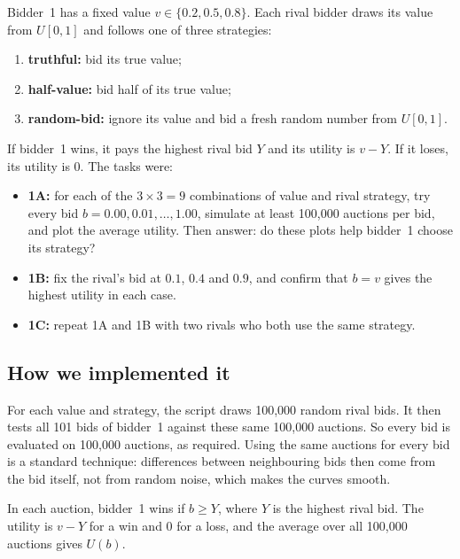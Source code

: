 \documentclass[11pt,a4paper]{article}
\begin{document}
Bidder~1 has a fixed value $v\in\{0.2, 0.5, 0.8\}$. Each rival bidder draws its value from $U[0,1]$ and follows one of three strategies:
\begin{enumerate}
  \item[(a)] \textbf{truthful:} bid its true value;
  \item[(b)] \textbf{half-value:} bid half of its true value;
  \item[(c)] \textbf{random-bid:} ignore its value and bid a fresh random number from $U[0,1]$.
\end{enumerate}
If bidder~1 wins, it pays the highest rival bid $Y$ and its utility is $v-Y$. If it loses, its utility is $0$. The tasks were:
\begin{itemize}
  \item \textbf{1A:} for each of the $3\times3=9$ combinations of value and rival strategy, try every bid $b=0.00,0.01,\ldots,1.00$, simulate at least 100,000 auctions per bid, and plot the average utility. Then answer: do these plots help bidder~1 choose its strategy?
  \item \textbf{1B:} fix the rival's bid at $0.1$, $0.4$ and $0.9$, and confirm that $b=v$ gives the highest utility in each case.
  \item \textbf{1C:} repeat 1A and 1B with two rivals who both use the same strategy.
\end{itemize}

\subsection{How we implemented it}

For each value and strategy, the script draws 100,000 random rival bids. It then tests all 101 bids of bidder~1 against these same 100,000 auctions. So every bid is evaluated on 100,000 auctions, as required. Using the same auctions for every bid is a standard technique: differences between neighbouring bids then come from the bid itself, not from random noise, which makes the curves smooth.

In each auction, bidder~1 wins if $b\geq Y$, where $Y$ is the highest rival bid. The utility is $v-Y$ for a win and $0$ for a loss, and the average over all 100,000 auctions gives $U(b)$.
\end{document}
